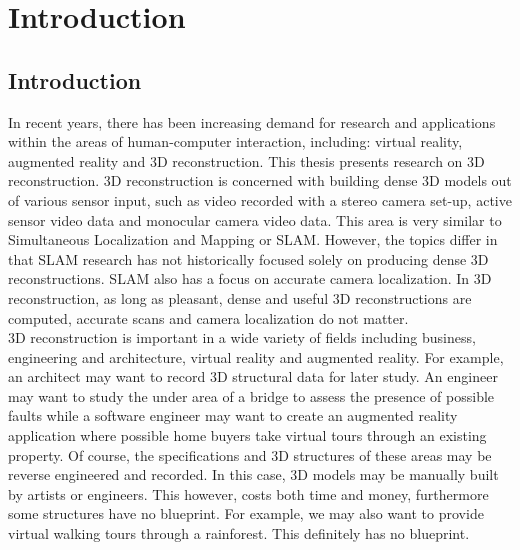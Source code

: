 \makeatletter
\chapter{Introduction}
\label{ch:IntroIntroduction}

\section{Introduction}

In recent years, there has been increasing demand for research and applications within the areas of human-computer interaction, including: virtual reality, augmented reality and 3D reconstruction. This thesis presents research on 3D reconstruction. 3D reconstruction is concerned with building dense 3D models out of various sensor input, such as video recorded with a stereo camera set-up, active sensor video data and monocular camera video data. This area is very similar to Simultaneous Localization and Mapping or SLAM. However, the topics differ in that SLAM research has not historically focused solely on producing dense 3D reconstructions. SLAM also has a focus on accurate camera localization. In 3D reconstruction, as long as pleasant, dense and useful 3D reconstructions are computed, accurate scans and camera localization do not matter. \\

3D reconstruction is important in a wide variety of fields including business, engineering and architecture, virtual reality and augmented reality. For example, an architect may want to record 3D structural data for later study. An engineer may want to study the under area of a bridge to assess the presence of possible faults while a software engineer may want to create an augmented reality application where possible home buyers take virtual tours through an existing property. Of course, the specifications and 3D structures of these areas may be reverse engineered and recorded. In this case, 3D models may be manually built by artists or engineers. This however, costs both time and money, furthermore some structures have no blueprint. For example, we may also want to provide virtual walking tours through a rainforest. This definitely has no blueprint. \\

